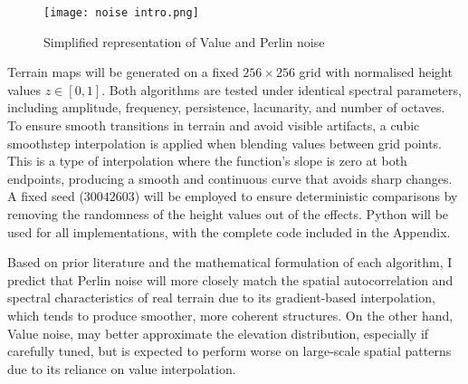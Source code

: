 \begin{figure}[H]
    \centering
    \texttt{[image: noise intro.png]}
    \caption{Simplified representation of Value and Perlin noise}
    \label{fig:noise_intro}
\end{figure}

Terrain maps will be generated on a fixed $256\times256$ grid with normalised height values $z\in[0,1]$. Both algorithms are tested
under identical spectral parameters, including amplitude, frequency, persistence, lacunarity, and number of octaves. To ensure smooth transitions 
in terrain and avoid visible artifacts, a cubic smoothstep interpolation is applied when blending values between grid points. This is a type of 
interpolation where the function's slope is zero at both endpoints, producing a smooth and continuous curve that avoids sharp changes. A fixed seed 
($30042603$) will be employed to ensure deterministic comparisons by removing the randomness of the height values out of the effects. Python will 
be used for all implementations, with the complete code included in the Appendix.

Based on prior literature and the mathematical formulation of each algorithm, I predict that Perlin noise will more closely match the spatial 
autocorrelation and spectral characteristics of real terrain due to its gradient-based interpolation, which tends to produce smoother, more 
coherent structures. On the other hand, Value noise, may better approximate the elevation distribution, especially if carefully tuned, but is 
expected to perform worse on large-scale spatial patterns due to its reliance on value interpolation.